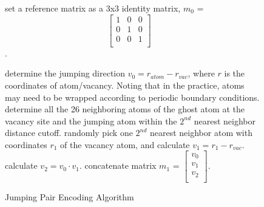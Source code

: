 \begin{figure}[!htb]
  \centering
  \begin{minipage}{.7\linewidth}
  
    \begin{algorithm}[H]
      \caption{Jumping Pair Encoding Algorithm}\label{algo:encode}
      \begin{algorithmic}[1]
        \State set a reference matrix as a 3x3 identity matrix, $m_0$ = $$\begin{bmatrix} 1 & 0 & 0 \\0 & 1 & 0 \\0 & 0 & 1 \\\end{bmatrix}\quad$$.
        
        \State determine the jumping direction $v_0 = r_{atom} - r_{vac}$, where $r$ is the coordinates of atom/vacancy. Noting that in the practice, atoms may need to be wrapped according to periodic boundary conditions.
        \State determine all the 26 neighboring atoms of the ghost atom at the vacancy site and the jumping atom within the $2^{nd}$ nearest neighbor distance cutoff.
        \State randomly pick one $2^{nd}$ nearest neighbor atom with coordinates $r_1$ of the vacancy atom, and calculate $v_1 = r_{1} - r_{vac}$.
        \State calculate $v_2 = v_0 \cdot v_1$.
        \State concatenate matrix $m_1$ = $\begin{bmatrix} v_0 \\v_1 \\v_2 \\\end{bmatrix}$.
        

\end{algorithmic}
\end{algorithm}
\end{minipage}
\end{figure}
